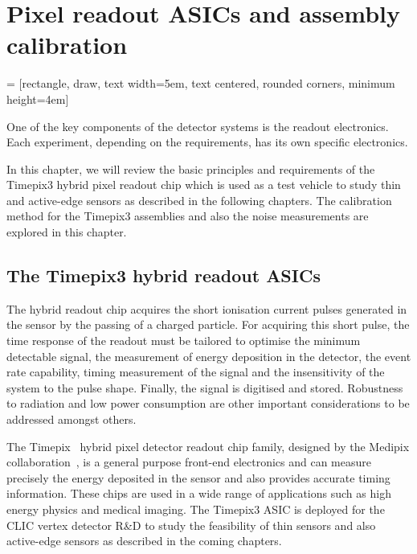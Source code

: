 \chapter{Pixel readout ASICs and assembly calibration}
\label{ch:FE_electronics}

 = [rectangle, draw, text width=5em, text centered, rounded corners, minimum
height=4em]
\usetikzlibrary{backgrounds,fit,decorations.pathreplacing} 

One of the key components of the detector systems is the readout
electronics. Each experiment, depending on the requirements, has its
own specific electronics. 



In this chapter, we will review the basic principles and requirements
of the Timepix3 hybrid pixel readout chip which is used as a test
vehicle to study thin and active-edge sensors as described in the
following chapters. The calibration method for the Timepix3 assemblies
and also the noise measurements are explored in this chapter.

\section{The Timepix3 hybrid readout ASICs}
\label{sec:TimepixChip}

The hybrid readout chip acquires the short ionisation current pulses
generated in the sensor by the passing of a charged particle. For
acquiring this short pulse, the time response of the readout must be
tailored to optimise the minimum detectable signal, the measurement of
energy deposition in the detector, the event rate capability, timing
measurement of the signal and the insensitivity of the system to the
pulse shape. Finally, the signal is digitised and stored. Robustness
to radiation and low power consumption are other important
considerations to be addressed amongst others.


The Timepix~\cite{art:tmpx,Timepix3Poikela} hybrid pixel detector
readout chip family, designed by the Medipix
collaboration~\cite{medipixCollaboration}, is a general purpose
front-end electronics and can measure precisely the energy deposited
in the sensor and also provides accurate timing information. These
chips are used in a wide range of applications such as high energy
physics and medical imaging. The Timepix3 ASIC is deployed for the
CLIC vertex detector R\&D to study the feasibility of thin sensors and
also active-edge sensors as described in the coming chapters.

